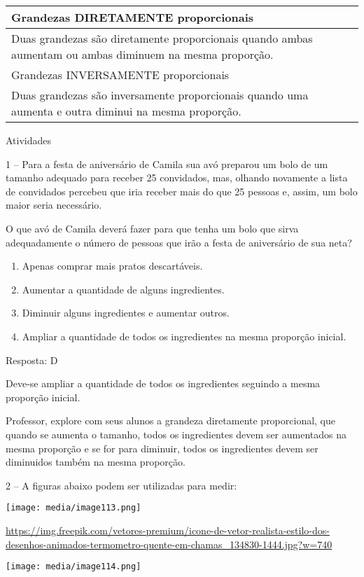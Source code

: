 \begin{longtable}[]{@{}l@{}}
\toprule
Grandezas DIRETAMENTE proporcionais\tabularnewline
\midrule
\endhead
Duas grandezas são diretamente proporcionais quando ambas aumentam ou
ambas diminuem na mesma proporção.\tabularnewline
Grandezas INVERSAMENTE proporcionais\tabularnewline
Duas grandezas são inversamente proporcionais quando uma aumenta e outra
diminui na mesma proporção.\tabularnewline
\bottomrule
\end{longtable}

Atividades

1 -- Para a festa de aniversário de Camila sua avó preparou um bolo de
um tamanho adequado para receber 25 convidados, mas, olhando novamente a
lista de convidados percebeu que iria receber mais do que 25 pessoas e,
assim, um bolo maior seria necessário.

O que avó de Camila deverá fazer para que tenha um bolo que sirva
adequadamente o número de pessoas que irão a festa de aniversário de sua
neta?

\begin{enumerate}
\def\labelenumi{\alph{enumi})}
\item
  Apenas comprar mais pratos descartáveis.
\item
  Aumentar a quantidade de alguns ingredientes.
\item
  Diminuir alguns ingredientes e aumentar outros.
\item
  Ampliar a quantidade de todos os ingredientes na mesma proporção
  inicial.
\end{enumerate}

Resposta: D

Deve-se ampliar a quantidade de todos os ingredientes seguindo a mesma
proporção inicial.

Professor, explore com seus alunos a grandeza diretamente proporcional,
que quando se aumenta o tamanho, todos os ingredientes devem ser
aumentados na mesma proporção e se for para diminuir, todos os
ingredientes devem ser diminuidos também na mesma proporção.

2 -- A figuras abaixo podem ser utilizadas para medir:

\texttt{[image: media/image113.png]}

\url{https://img.freepik.com/vetores-premium/icone-de-vetor-realista-estilo-dos-desenhos-animados-termometro-quente-em-chamas_134830-1444.jpg?w=740}

\texttt{[image: media/image114.png]}

